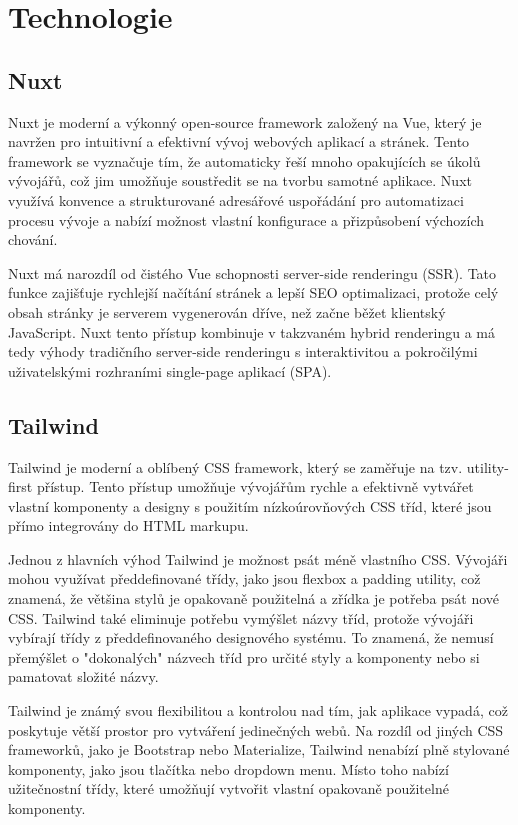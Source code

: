 
\chapter{Technologie}
\label{chap:technologie}

\section{Nuxt}
Nuxt je moderní a výkonný open-source framework založený na Vue, který je navržen pro intuitivní a efektivní vývoj webových aplikací a stránek.
Tento framework se vyznačuje tím, že automaticky řeší mnoho opakujících se úkolů vývojářů, což jim umožňuje soustředit se na tvorbu samotné aplikace.
Nuxt využívá konvence a strukturované adresářové uspořádání pro automatizaci procesu vývoje a nabízí možnost vlastní konfigurace a přizpůsobení výchozích chování.

Nuxt má narozdíl od čistého Vue schopnosti server-side renderingu (SSR). Tato funkce zajišťuje rychlejší načítání stránek a lepší SEO optimalizaci,
protože celý obsah stránky je serverem vygenerován dříve, než začne běžet klientský JavaScript. Nuxt tento přístup kombinuje v takzvaném hybrid renderingu a má
tedy výhody tradičního server-side renderingu s interaktivitou a pokročilými uživatelskými rozhraními single-page aplikací (SPA). \cite{NuxtRenderingModes}

\section{Tailwind}
Tailwind je moderní a oblíbený CSS framework, který se zaměřuje na tzv. utility-first přístup. Tento přístup umožňuje vývojářům rychle a efektivně vytvářet
vlastní komponenty a designy s použitím nízkoúrovňových CSS tříd, které jsou přímo integrovány do HTML markupu.

Jednou z hlavních výhod Tailwind je možnost psát méně vlastního CSS. Vývojáři mohou využívat předdefinované třídy, jako jsou flexbox a padding utility, což znamená,
že většina stylů je opakovaně použitelná a zřídka je potřeba psát nové CSS. Tailwind také eliminuje potřebu vymýšlet názvy tříd, protože vývojáři vybírají třídy z
předdefinovaného designového systému. To znamená, že nemusí přemýšlet o "dokonalých" názvech tříd pro určité styly a komponenty nebo si pamatovat složité názvy. \cite{TailwindUtilityFirst}

Tailwind je známý svou flexibilitou a kontrolou nad tím, jak aplikace vypadá, což poskytuje větší prostor pro vytváření jedinečných webů. Na rozdíl od jiných CSS frameworků,
jako je Bootstrap nebo Materialize, Tailwind nenabízí plně stylované komponenty, jako jsou tlačítka nebo dropdown menu. Místo toho nabízí užitečnostní třídy,
které umožňují vytvořit vlastní opakovaně použitelné komponenty.

